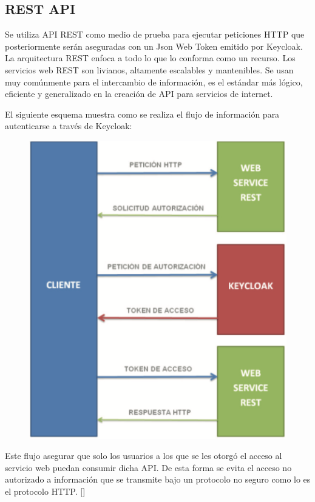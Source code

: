 
\subsection{REST API}
Se utiliza API REST como medio de prueba para ejecutar peticiones HTTP que posteriormente serán aseguradas con un Json Web Token emitido por Keycloak. La arquitectura REST enfoca a todo lo que lo conforma como un recurso. Los servicios web REST son livianos, altamente escalables y mantenibles. Se usan muy comúnmente para el intercambio de información, es el estándar más lógico, eficiente y generalizado en la creación de API para servicios de internet.

El siguiente esquema muestra como se realiza el flujo de información para autenticarse a través de Keycloak:

\begin{figure}[H]
	\centering
	\includegraphics[width=0.7\linewidth]{Graphics/keycloak_info_flux}
	\caption{}
	\label{fig:Flujo de Información en Keycloak}
\end{figure}

Este flujo asegurar que solo los usuarios a los que se les otorgó el acceso al servicio web puedan consumir dicha API. De esta forma se evita el acceso no autorizado a información que se transmite bajo un protocolo no seguro como lo es el protocolo HTTP. [\cite{muyon2020metodos}]
